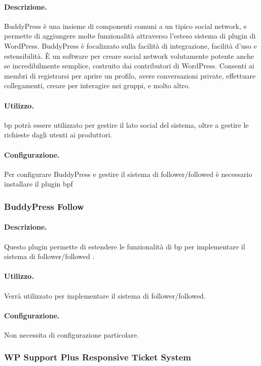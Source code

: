 \paragraph{Descrizione.}
BuddyPress è una insieme di componenti comuni a un tipico social network, e permette di aggiungere molte funzionalità attraverso l'esteso sistema di plugin di WordPress.
BuddyPress è focalizzato sulla facilità di integrazione, facilità d'uso e estensibilità. È un software per creare social network volutamente potente anche se incredibilmente semplice, costruito dai contributori di WordPress.
Consenti ai membri di registrarsi per aprire un profilo, avere conversazioni private, effettuare collegamenti, creare per interagire nei gruppi, e molto altro. 
\paragraph{Utilizzo.}
\gls{bp} potrà essere utilizzato per gestire il lato social del sistema, oltre a gestire le richieste dagli utenti ai produttori.
\paragraph{Configurazione.}
Per configurare BuddyPress e gestire il sistema di follower/followed è necessario installare il plugin \gls{bpf}

\subsubsection{BuddyPress Follow}
\paragraph{Descrizione.}
Questo plugin permette di estendere le funzionalità di \gls{bp} per implementare il sistema di follower/followed .
\paragraph{Utilizzo.} Verrà utilizzato per implementare il sistema di follower/followed.
\paragraph{Configurazione.} Non necessita di configurazione particolare.

\subsubsection{WP Support Plus Responsive Ticket System}
